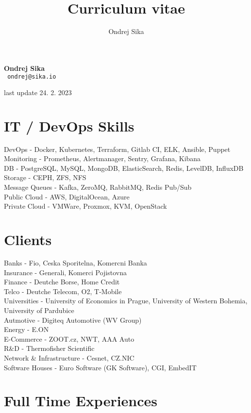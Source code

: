 \documentclass[12pt,a4paper]{article}
\title{Curriculum vitae}
\author{Ondrej Sika}
\begin{document}
\begin{center}

{\Huge \bf Ondrej Sika}\\
\vspace{0.2cm}
\texttt{ ondrej@sika.io}
\end{center}

\vspace*{0.3cm}
{\hfill last update 24. 2. 2023}\\

\section*{IT / DevOps Skills}
DevOps - Docker, Kubernetes, Terraform, Gitlab CI, ELK, Ansible, Puppet\\
Monitoring - Prometheus, Alertmanager, Sentry, Grafana, Kibana\\
DB - PostgreSQL, MySQL, MongoDB, ElasticSearch, Redis, LevelDB, InfluxDB\\
Storage - CEPH, ZFS, NFS\\
Message Queues - Kafka, ZeroMQ, RabbitMQ, Redis Pub/Sub\\
Public Cloud - AWS, DigitalOcean, Azure\\
Private Cloud - VMWare, Proxmox, KVM, OpenStack\\

\section*{Clients}
Banks - Fio, Ceska Sporitelna, Komercni Banka\\
Insurance - Generali, Komerci Pojistovna\\
Finance - Deutche Borse, Home Credit\\
Telco - Deutche Telecom, O2, T-Mobile\\
Universities - University of Economics in Prague, University of Western Bohemia, University of Pardubice\\
Autmotive - Digiteq Automotive (WV Group)\\
Energy - E.ON\\
E-Commerce - ZOOT.cz, NWT, AAA Auto\\
R\&D - Thermofisher Scientific\\
Network \& Infrastructure - Cesnet, CZ.NIC\\
Software Houses - Euro Software (GK Software), CGI, EmbedIT\\

\section*{Full Time Experiences}
\end{document}
